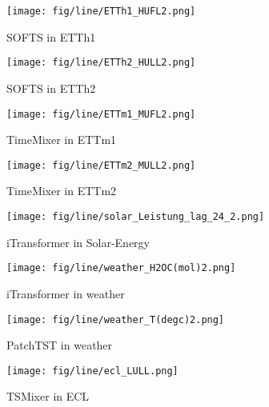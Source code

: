 \documentclass{article}
\begin{document}
\begin{figure}[htbp]
    \centering
     \caption{}
    \begin{minipage}{0.48 \textwidth}
        \centering
        \texttt{[image: fig/line/ETTh1\_HUFL2.png]}
        \caption*{SOFTS in ETTh1}
    \end{minipage}
    \hfill
    \begin{minipage}{0.48\textwidth}
        \centering
        \texttt{[image: fig/line/ETTh2\_HULL2.png]}
        \caption*{SOFTS in ETTh2}
    \end{minipage}

    \vspace{0.5cm}
    
    \begin{minipage}{0.48\textwidth}
        \centering
        \texttt{[image: fig/line/ETTm1\_MUFL2.png]}
        \caption*{TimeMixer in ETTm1}
    \end{minipage}
    \hfill
    \begin{minipage}{0.48\textwidth}
        \centering
        \texttt{[image: fig/line/ETTm2\_MULL2.png]}
        \caption*{TimeMixer in ETTm2}
    \end{minipage}

    \vspace{0.5cm}

    \begin{minipage}{0.48\textwidth}
        \centering
        \texttt{[image: fig/line/solar\_Leistung\_lag\_24\_2.png]}
        \caption*{iTransformer in Solar-Energy}
    \end{minipage}
    \hfill
    \begin{minipage}{0.48\textwidth}
        \centering
        \texttt{[image: fig/line/weather\_H2OC(mol)2.png]}
        \caption*{iTransformer in weather}
    \end{minipage}

    \vspace{0.5cm}

    \begin{minipage}{0.48\textwidth}
        \centering
        \texttt{[image: fig/line/weather\_T(degc)2.png]}
        \caption*{PatchTST in weather}
    \end{minipage}
    \hfill
    \begin{minipage}{0.48\textwidth}
        \centering
        \texttt{[image: fig/line/ecl\_LULL.png]}
        \caption*{TSMixer in ECL}
    \end{minipage}
\end{figure}
\end{document}
